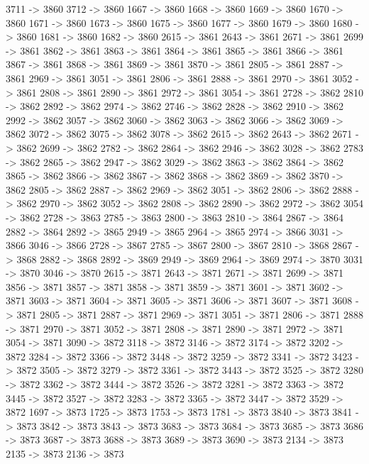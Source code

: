 {	3711 -> 3860
	3712 -> 3860
	1667 -> 3860
	1668 -> 3860
	1669 -> 3860
	1670 -> 3860
	1671 -> 3860
	1673 -> 3860
	1675 -> 3860
	1677 -> 3860
	1679 -> 3860
	1680 -> 3860
	1681 -> 3860
	1682 -> 3860
	2615 -> 3861
	2643 -> 3861
	2671 -> 3861
	2699 -> 3861
	3862 -> 3861
	3863 -> 3861
	3864 -> 3861
	3865 -> 3861
	3866 -> 3861
	3867 -> 3861
	3868 -> 3861
	3869 -> 3861
	3870 -> 3861
	2805 -> 3861
	2887 -> 3861
	2969 -> 3861
	3051 -> 3861
	2806 -> 3861
	2888 -> 3861
	2970 -> 3861
	3052 -> 3861
	2808 -> 3861
	2890 -> 3861
	2972 -> 3861
	3054 -> 3861
	2728 -> 3862
	2810 -> 3862
	2892 -> 3862
	2974 -> 3862
	2746 -> 3862
	2828 -> 3862
	2910 -> 3862
	2992 -> 3862
	3057 -> 3862
	3060 -> 3862
	3063 -> 3862
	3066 -> 3862
	3069 -> 3862
	3072 -> 3862
	3075 -> 3862
	3078 -> 3862
	2615 -> 3862
	2643 -> 3862
	2671 -> 3862
	2699 -> 3862
	2782 -> 3862
	2864 -> 3862
	2946 -> 3862
	3028 -> 3862
	2783 -> 3862
	2865 -> 3862
	2947 -> 3862
	3029 -> 3862
	3863 -> 3862
	3864 -> 3862
	3865 -> 3862
	3866 -> 3862
	3867 -> 3862
	3868 -> 3862
	3869 -> 3862
	3870 -> 3862
	2805 -> 3862
	2887 -> 3862
	2969 -> 3862
	3051 -> 3862
	2806 -> 3862
	2888 -> 3862
	2970 -> 3862
	3052 -> 3862
	2808 -> 3862
	2890 -> 3862
	2972 -> 3862
	3054 -> 3862
	2728 -> 3863
	2785 -> 3863
	2800 -> 3863
	2810 -> 3864
	2867 -> 3864
	2882 -> 3864
	2892 -> 3865
	2949 -> 3865
	2964 -> 3865
	2974 -> 3866
	3031 -> 3866
	3046 -> 3866
	2728 -> 3867
	2785 -> 3867
	2800 -> 3867
	2810 -> 3868
	2867 -> 3868
	2882 -> 3868
	2892 -> 3869
	2949 -> 3869
	2964 -> 3869
	2974 -> 3870
	3031 -> 3870
	3046 -> 3870
	2615 -> 3871
	2643 -> 3871
	2671 -> 3871
	2699 -> 3871
	3856 -> 3871
	3857 -> 3871
	3858 -> 3871
	3859 -> 3871
	3601 -> 3871
	3602 -> 3871
	3603 -> 3871
	3604 -> 3871
	3605 -> 3871
	3606 -> 3871
	3607 -> 3871
	3608 -> 3871
	2805 -> 3871
	2887 -> 3871
	2969 -> 3871
	3051 -> 3871
	2806 -> 3871
	2888 -> 3871
	2970 -> 3871
	3052 -> 3871
	2808 -> 3871
	2890 -> 3871
	2972 -> 3871
	3054 -> 3871
	3090 -> 3872
	3118 -> 3872
	3146 -> 3872
	3174 -> 3872
	3202 -> 3872
	3284 -> 3872
	3366 -> 3872
	3448 -> 3872
	3259 -> 3872
	3341 -> 3872
	3423 -> 3872
	3505 -> 3872
	3279 -> 3872
	3361 -> 3872
	3443 -> 3872
	3525 -> 3872
	3280 -> 3872
	3362 -> 3872
	3444 -> 3872
	3526 -> 3872
	3281 -> 3872
	3363 -> 3872
	3445 -> 3872
	3527 -> 3872
	3283 -> 3872
	3365 -> 3872
	3447 -> 3872
	3529 -> 3872
	1697 -> 3873
	1725 -> 3873
	1753 -> 3873
	1781 -> 3873
	3840 -> 3873
	3841 -> 3873
	3842 -> 3873
	3843 -> 3873
	3683 -> 3873
	3684 -> 3873
	3685 -> 3873
	3686 -> 3873
	3687 -> 3873
	3688 -> 3873
	3689 -> 3873
	3690 -> 3873
	2134 -> 3873
	2135 -> 3873
	2136 -> 3873
}
